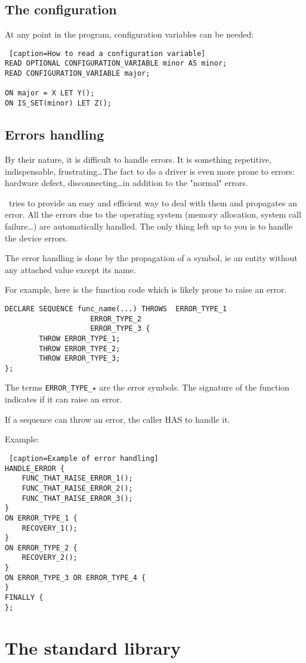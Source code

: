 \documentclass[american]{rtxreport}
\begin{document}
\section{The configuration}

At any point in the program, configuration variables can be needed:

\begin{lstlisting} [caption=How to read a configuration variable]
READ OPTIONAL CONFIGURATION_VARIABLE minor AS minor;
READ CONFIGURATION_VARIABLE major;

ON major = X LET Y();
ON IS_SET(minor) LET Z();
\end{lstlisting}

\section{Errors handling}


By their nature, it is difficult to handle errors. It is something repetitive,
indispensable, frustrating\ldots The fact to do a driver is even more prone to errors:
hardware defect, disconnecting\ldots in addition to the "normal" errors.


\rtx\ tries to provide an easy and efficient way to deal with them and propagates an error.
All the errors due to the operating system (memory allocation, system call failure\ldots) are
automatically handled.
The only thing left up to you is to handle the device errors.

The error handling is done by the propagation of a symbol, ie an entity without any attached value
except its name.


For example, here is the function code which is likely prone to raise an error.
\begin{lstlisting}
DECLARE SEQUENCE func_name(...) THROWS	ERROR_TYPE_1
					ERROR_TYPE_2
					ERROR_TYPE_3 {
		THROW ERROR_TYPE_1;
		THROW ERROR_TYPE_2;
		THROW ERROR_TYPE_3;
};
\end{lstlisting}

The terms \texttt{ERROR\_TYPE\_$\star$} are the error symbols.
The signature of the function indicates if it can raise an error.

If a sequence can throw an error, the caller HAS to handle it.

Example:

\begin{lstlisting} [caption=Example of error handling]
HANDLE_ERROR {
	FUNC_THAT_RAISE_ERROR_1();
	FUNC_THAT_RAISE_ERROR_2();
	FUNC_THAT_RAISE_ERROR_3();
}
ON ERROR_TYPE_1 {
	RECOVERY_1();
}
ON ERROR_TYPE_2 {
	RECOVERY_2();
}
ON ERROR_TYPE_3 OR ERROR_TYPE_4 {
}
FINALLY {
};
\end{lstlisting}

\chapter{The standard library}
\end{document}
